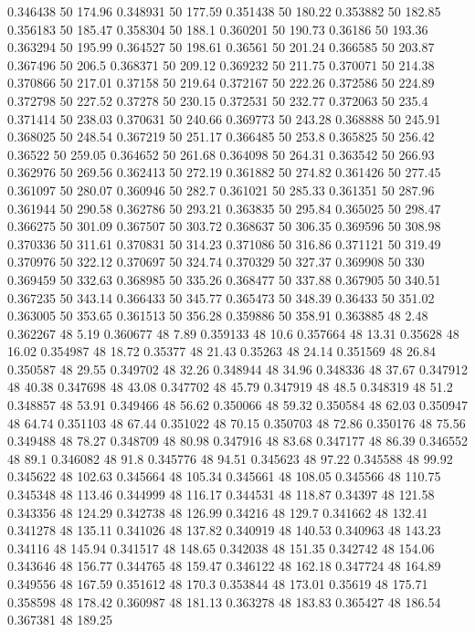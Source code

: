 0.346438 50 174.96
0.348931 50 177.59
0.351438 50 180.22
0.353882 50 182.85
0.356183 50 185.47
0.358304 50 188.1
0.360201 50 190.73
0.36186 50 193.36
0.363294 50 195.99
0.364527 50 198.61
0.36561 50 201.24
0.366585 50 203.87
0.367496 50 206.5
0.368371 50 209.12
0.369232 50 211.75
0.370071 50 214.38
0.370866 50 217.01
0.37158 50 219.64
0.372167 50 222.26
0.372586 50 224.89
0.372798 50 227.52
0.37278 50 230.15
0.372531 50 232.77
0.372063 50 235.4
0.371414 50 238.03
0.370631 50 240.66
0.369773 50 243.28
0.368888 50 245.91
0.368025 50 248.54
0.367219 50 251.17
0.366485 50 253.8
0.365825 50 256.42
0.36522 50 259.05
0.364652 50 261.68
0.364098 50 264.31
0.363542 50 266.93
0.362976 50 269.56
0.362413 50 272.19
0.361882 50 274.82
0.361426 50 277.45
0.361097 50 280.07
0.360946 50 282.7
0.361021 50 285.33
0.361351 50 287.96
0.361944 50 290.58
0.362786 50 293.21
0.363835 50 295.84
0.365025 50 298.47
0.366275 50 301.09
0.367507 50 303.72
0.368637 50 306.35
0.369596 50 308.98
0.370336 50 311.61
0.370831 50 314.23
0.371086 50 316.86
0.371121 50 319.49
0.370976 50 322.12
0.370697 50 324.74
0.370329 50 327.37
0.369908 50 330
0.369459 50 332.63
0.368985 50 335.26
0.368477 50 337.88
0.367905 50 340.51
0.367235 50 343.14
0.366433 50 345.77
0.365473 50 348.39
0.36433 50 351.02
0.363005 50 353.65
0.361513 50 356.28
0.359886 50 358.91
0.363885 48 2.48
0.362267 48 5.19
0.360677 48 7.89
0.359133 48 10.6
0.357664 48 13.31
0.35628 48 16.02
0.354987 48 18.72
0.35377 48 21.43
0.35263 48 24.14
0.351569 48 26.84
0.350587 48 29.55
0.349702 48 32.26
0.348944 48 34.96
0.348336 48 37.67
0.347912 48 40.38
0.347698 48 43.08
0.347702 48 45.79
0.347919 48 48.5
0.348319 48 51.2
0.348857 48 53.91
0.349466 48 56.62
0.350066 48 59.32
0.350584 48 62.03
0.350947 48 64.74
0.351103 48 67.44
0.351022 48 70.15
0.350703 48 72.86
0.350176 48 75.56
0.349488 48 78.27
0.348709 48 80.98
0.347916 48 83.68
0.347177 48 86.39
0.346552 48 89.1
0.346082 48 91.8
0.345776 48 94.51
0.345623 48 97.22
0.345588 48 99.92
0.345622 48 102.63
0.345664 48 105.34
0.345661 48 108.05
0.345566 48 110.75
0.345348 48 113.46
0.344999 48 116.17
0.344531 48 118.87
0.34397 48 121.58
0.343356 48 124.29
0.342738 48 126.99
0.34216 48 129.7
0.341662 48 132.41
0.341278 48 135.11
0.341026 48 137.82
0.340919 48 140.53
0.340963 48 143.23
0.34116 48 145.94
0.341517 48 148.65
0.342038 48 151.35
0.342742 48 154.06
0.343646 48 156.77
0.344765 48 159.47
0.346122 48 162.18
0.347724 48 164.89
0.349556 48 167.59
0.351612 48 170.3
0.353844 48 173.01
0.35619 48 175.71
0.358598 48 178.42
0.360987 48 181.13
0.363278 48 183.83
0.365427 48 186.54
0.367381 48 189.25

